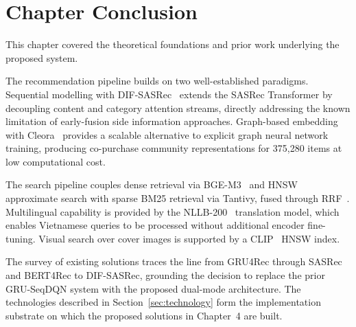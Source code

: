 \section{Chapter Conclusion}

This chapter covered the theoretical foundations and prior work underlying the proposed system.

The recommendation pipeline builds on two well-established paradigms.
Sequential modelling with DIF-SASRec~\cite{xie2022difsasrec} extends the SASRec Transformer by decoupling content and category attention streams, directly addressing the known limitation of early-fusion side information approaches.
Graph-based embedding with Cleora~\cite{rychalska2021cleora} provides a scalable alternative to explicit graph neural network training, producing co-purchase community representations for 375{,}280 items at low computational cost.

The search pipeline couples dense retrieval via BGE-M3~\cite{chen2024bge} and HNSW~\cite{malkov2018hnsw} approximate search with sparse BM25 retrieval via Tantivy, fused through RRF~\cite{cormack2009rrf}.
Multilingual capability is provided by the NLLB-200~\cite{nllb2022} translation model, which enables Vietnamese queries to be processed without additional encoder fine-tuning.
Visual search over cover images is supported by a CLIP~\cite{radford2021clip} HNSW index.

The survey of existing solutions traces the line from GRU4Rec through SASRec and BERT4Rec to DIF-SASRec, grounding the decision to replace the prior GRU-SeqDQN system with the proposed dual-mode architecture.
The technologies described in Section~\ref{sec:technology} form the implementation substrate on which the proposed solutions in Chapter~4 are built.

